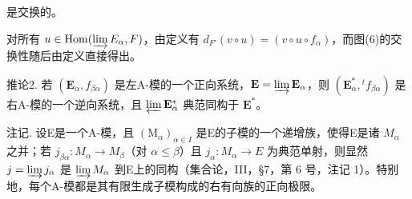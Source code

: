 是交换的。

对所有 \(u \in \operatorname{Hom}(\varinjlim E_{\alpha}, F)\)，由定义有 \(d_{F'}(v \circ u) = (v \circ u \circ f_{\alpha})\)，而图(6)的交换性随后由定义直接得出。

推论2. 若 \((\mathbf{E}_{\alpha}, f_{\beta \alpha})\) 是左A-模的一个正向系统，\(\mathbf{E} = \varinjlim \mathbf{E}_{\alpha}\)，则 \((\mathbf{E}_{\alpha}^{*}, {}^t f_{\beta \alpha})\) 是右A-模的一个逆向系统，且 \(\varprojlim \mathbf{E}_{\alpha}^{*}\) 典范同构于 \(\mathbf{E}^{*}\)。

注记. 设E是一个A-模，且 \((\mathrm{M}_{\alpha})_{\alpha\in I}\) 是E的子模的一个递增族，使得E是诸 \(M_{\alpha}\) 之并；若 \(j_{\beta\alpha}:M_{\alpha}\to M_{\beta}\)（对 \(\alpha\leqslant\beta\)）且 \(j_{\alpha}:M_{\alpha}\to E\) 为典范单射，则显然 \(j=\varinjlim j_{\alpha}\) 是 \(\varinjlim M_{\alpha}\) 到E上的同构（集合论，III，§7，第 6 号，注记 1）。特别地，每个A-模都是其有限生成子模构成的右有向族的正向极限。

